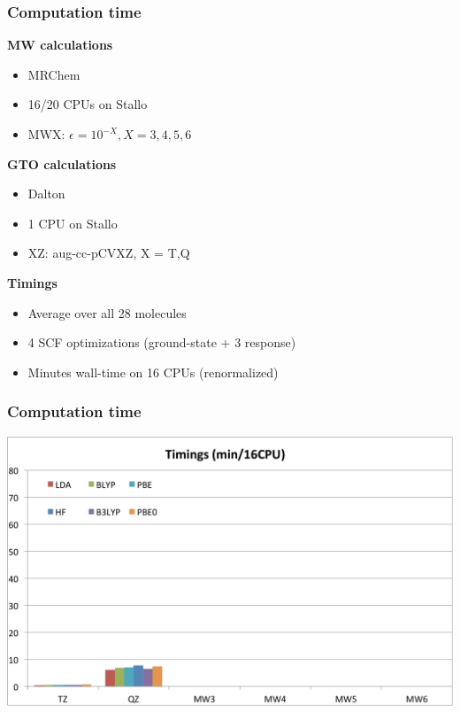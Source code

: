 \begin{frame}
\frametitle{Computation time}
\textbf{MW calculations}
\begin{itemize}
    \item   MRChem
    \item   16/20 CPUs on Stallo
    \item   MWX: $\epsilon=10^{-X}, X=3,4,5,6$
\end{itemize}

\vspace{5mm}

\textbf{GTO calculations}
\begin{itemize}
    \item   Dalton
    \item   1 CPU on Stallo
    \item   XZ: aug-cc-pCVXZ, X = T,Q
\end{itemize}

\vspace{5mm}

\textbf{Timings}
\begin{itemize}
    \item   Average over all 28 molecules
    \item   4 SCF optimizations (ground-state + 3 response)
    \item   Minutes wall-time on 16 CPUs (renormalized)
\end{itemize}
\end{frame}

\begin{frame}
\frametitle{Computation time}
\centering
\includegraphics[scale=0.3]{figures/time_1.pdf}
\end{frame}

